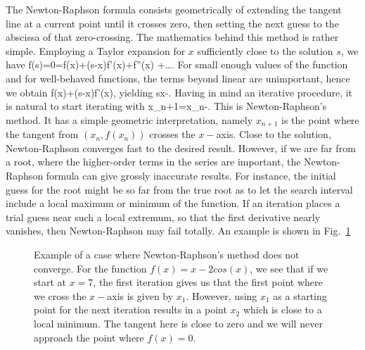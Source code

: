 The
Newton-Raphson formula consists geometrically of 
extending the tangent line at a
current point
until it crosses zero, then setting the next guess
to the abscissa
of that zero-crossing.
The mathematics behind this method is rather simple. Employing a Taylor
expansion for $x$ sufficiently close to the solution $s$, we
have 
\be
    f(s)=0=f(x)+(s-x)f'(x)+f''(x) +\dots.
    \label{eq:taylornr}
\ee
For small enough values of the function and for well-behaved functions, 
the terms beyond
linear are unimportant, hence we obtain
\be
   f(x)+(s-x)f'(x),
\ee
yielding
\be
   s\approx x-.
\ee
Having in mind an iterative procedure, it is natural to start iterating with
\be
   x_{n+1}=x_n-.
\ee
This is Newton-Raphson's method. It has a simple geometric interpretation, namely
$x_{n+1}$ is the point where the tangent from $(x_n,f(x_n))$ crosses the $x-$axis.
Close to the solution, Newton-Raphson converges fast
to the desired result. However, if we are
far from a root, where the higher-order terms in the series are important, the
Newton-Raphson formula can give grossly inaccurate results. For
instance, the initial guess for the root might be so far from the true root as to let
the search interval include a local maximum or minimum of the function. 
If an iteration places a trial guess near
such a local extremum, so that the first derivative nearly vanishes, then Newton-Raphson
may fail totally. An example is shown in Fig.\ \ref{fig:chap8fig4}
\begin{figure}
   
   \caption{Example of a case where Newton-Raphson's
            method does not converge. For the function $f(x)=x-2cos(x)$, we see that 
            if we start at $x=7$, the first iteration gives us that the first point where
            we cross the $x-$axis is given by $x_1$. However, using $x_1$ as a starting
            point for the next iteration results in a point $x_2$ which is close
            to a local minimum. The tangent here is close to zero and we will never
            approach the point where $f(x)=0$.}
   \label{fig:chap8fig4}
\end{figure}

